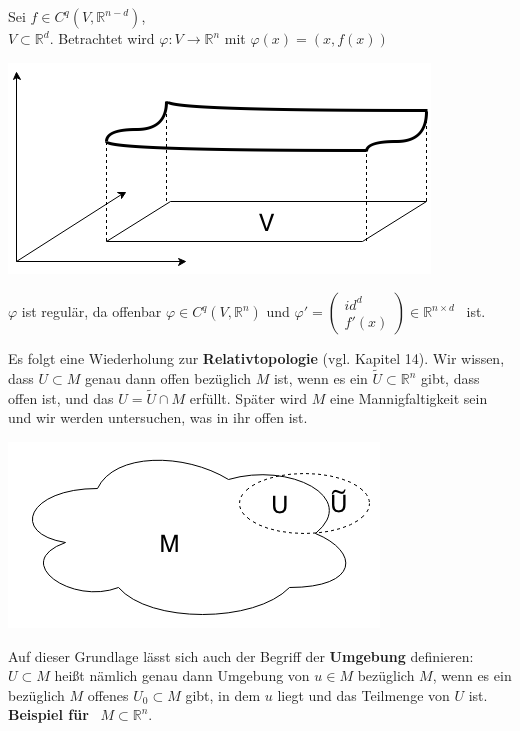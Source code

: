 \begin{beispiel}
Sei $f\in C^q(V,\mathbb{R}^{n-d})$,\\
$V\subset\mathbb{R}^d$. Betrachtet wird $\varphi:V\rightarrow\mathbb{R}^n$ mit $\varphi(x)=(x,f(x))$\\
    \begin{center}
    \includegraphics[scale=0.5]{pictures/001-05}\\
    \end{center}
$\varphi$ ist regulär, da offenbar $\varphi\in C^q(V,\mathbb{R}^n)$ 
und $\varphi'=
    \begin{pmatrix} 
    id^d \\ 
    f'(x)
    \end{pmatrix}     
\in \mathbb{R}^{n \times d}$ \ ist.\\
\linebreak
\end{beispiel}

Es folgt eine Wiederholung zur \textbf{Relativtopologie} (vgl. Kapitel 14). Wir wissen, dass $U\subset M$ genau dann offen bezüglich $M$ ist, wenn es ein $\tilde{U}\subset\mathbb{R}^n$ gibt, dass offen ist, und das $U=\tilde{U}\cap M$ erfüllt. Später wird $M$ eine Mannigfaltigkeit sein und wir werden untersuchen, was in ihr offen ist.\\

\begin{center}
\includegraphics[scale=0.5]{pictures/001-06}\\
\end{center}
Auf dieser Grundlage lässt sich auch der Begriff der \textbf{Umgebung} definieren:\\
$U\subset M$ heißt nämlich genau dann Umgebung von $u\in M$ bezüglich $M$, wenn es ein bezüglich $M$ offenes $U_0\subset M$ gibt, in dem $u$ liegt und das Teilmenge von $U$ ist.\linebreak\linebreak
\newpage
\textbf{\textsf{Beispiel für}} \ $M\subset\mathbb{R}^n$.\\

